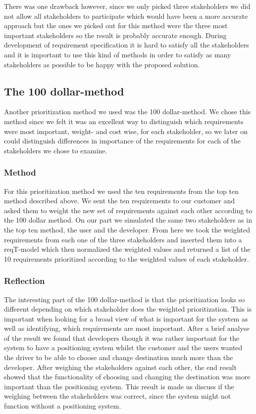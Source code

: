 \documentclass[10pt]{article}
\begin{document}
\noindent There was one drawback however, since we only picked three stakeholders we did not allow all stakeholders to participate which would have been a more accurate approach but the ones we picked out for this method were the three most important stakeholders so the result is probably accurate enough.
During development of requirement specification it is hard to satisfy all the stakeholders and it is important to use this kind of methods in order to satisfy as many stakeholders as possible to be happy with the proposed solution.

\subsection{The 100 dollar-method}
Another prioritization method we used was the 100 dollar-method. We chose this method since we felt it was an excellent way to distinguish which requirements were most important, weight- and cost wise, for each stakeholder, so we later on could distinguish differences in importance of the requirements for each of the stakeholders we chose to examine.
\subsubsection{Method}
For this prioritization method we used the ten requirements from the top ten method described above. We sent the ten requirements to our customer and asked them to weight the new set of requirements against each other according to the 100 dollar method. On our part we simulated the same two stakeholders as in the top ten method, the user and the developer. From here we took the weighted requirements from each one of the three stakeholders and inserted them into a reqT-model which then normalized the weighted values and returned a list of the 10 requirements prioritized according to the weighted values of each stakeholder.
\subsubsection{Reflection}
The interesting part of the 100 dollar-method is that the prioritization looks so different depending on which stakeholder does the weighted prioritization. This is important when looking for a broad view of what is important for the system as well as identifying, which requirements are most important. After a brief analyse of the result we found that developers though it was rather important for the system to have a positioning system whilst the customer and the users wanted the driver to be able to choose and change destination much more than the developer. After weighing the stakeholders against each other, the end result showed that the functionality of choosing and changing the destination was more important than the positioning system. This result is made us discuss if the weighing between the stakeholders was correct, since the system might not function without a positioning system.
\end{document}
